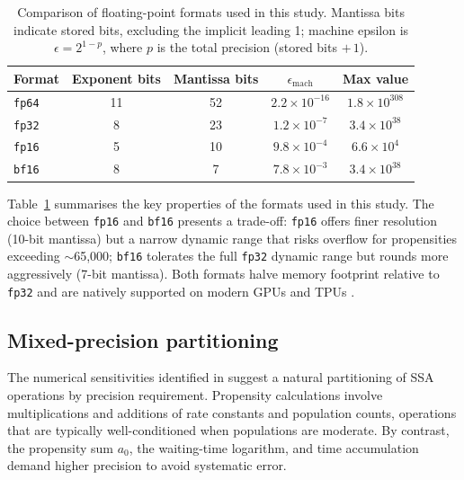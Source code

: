 \documentclass{article}
\begin{document}
\begin{table}[ht]
    \centering
    \begin{tabular}{@{}lcccc@{}}
        \toprule
        Format & Exponent bits & Mantissa bits & $\epsilon_{\mathrm{mach}}$ & Max value \\
        \midrule
        \texttt{fp64} & 11 & 52 & $2.2 \times 10^{-16}$ & $1.8 \times 10^{308}$ \\
        \texttt{fp32} & 8 & 23 & $1.2 \times 10^{-7}$ & $3.4 \times 10^{38}$ \\
        \texttt{fp16} & 5 & 10 & $9.8 \times 10^{-4}$ & $6.6 \times 10^{4}$ \\
        \texttt{bf16} & 8 & 7 & $7.8 \times 10^{-3}$ & $3.4 \times 10^{38}$ \\
        \bottomrule
    \end{tabular}
    \caption{Comparison of floating-point formats used in this study. Mantissa bits indicate stored bits, excluding the implicit leading 1; machine epsilon is $\epsilon = 2^{1-p}$, where $p$ is the total precision (stored bits $+\, 1$).}
    \label{tab:formats}
\end{table}

Table~\ref{tab:formats} summarises the key properties of the formats used in this study. The choice between \texttt{fp16} and \texttt{bf16} presents a trade-off: \texttt{fp16} offers finer resolution (10-bit mantissa) but a narrow dynamic range that risks overflow for propensities exceeding $\sim$65,000; \texttt{bf16} tolerates the full \texttt{fp32} dynamic range but rounds more aggressively (7-bit mantissa). Both formats halve memory footprint relative to \texttt{fp32} and are natively supported on modern GPUs and TPUs \cite{jouppi2017,kalamkar2019}.

\subsection{Mixed-precision partitioning}

The numerical sensitivities identified in  suggest a natural partitioning of SSA operations by precision requirement. Propensity calculations involve multiplications and additions of rate constants and population counts, operations that are typically well-conditioned when populations are moderate. By contrast, the propensity sum $a_0$, the waiting-time logarithm, and time accumulation demand higher precision to avoid systematic error.
\end{document}

